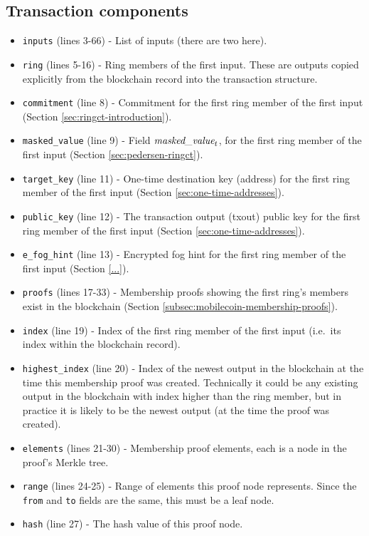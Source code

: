 \begin{appendices}
\section*{Transaction components}
	
\begin{itemize}
	\item {\tt inputs} (lines 3-66) - List of inputs (there are two here).
	\item {\tt ring} (lines 5-16) - Ring members of the first input. These are outputs copied explicitly from the blockchain record into the transaction structure.
	\item {\tt commitment} (line 8) - Commitment for the first ring member of the first input (Section \ref{sec:ringct-introduction}).
	\item {\tt masked\_value} (line 9) - Field $\textrm{\em masked\_value}_t$, for the first ring member of the first input (Section \ref{sec:pedersen-ringct}).
	\item {\tt target\_key} (line 11) - One-time destination key (address) for the first ring member of the first input (Section \ref{sec:one-time-addresses}).
	\item {\tt public\_key} (line 12) - The transaction output (txout) public key for the first ring member of the first input (Section \ref{sec:one-time-addresses}).
	\item {\tt e\_fog\_hint} (line 13) - Encrypted fog hint for the first ring member of the first input (Section \ref{...}).%
	\item {\tt proofs} (lines 17-33) - Membership proofs showing the first ring's members exist in the blockchain (Section \ref{subsec:mobilecoin-membership-proofs}).
	\item {\tt index} (line 19) - Index of the first ring member of the first input (i.e.\ its index within the blockchain record).
	\item {\tt highest\_index} (line 20) - Index of the newest output in the blockchain at the time this membership proof was created. Technically it could be any existing output in the blockchain with index higher than the ring member, but in practice it is likely to be the newest output (at the time the proof was created).
	\item {\tt elements} (lines 21-30) - Membership proof elements, each is a node in the proof's Merkle tree.
	\item {\tt range} (lines 24-25) - Range of elements this proof node represents. Since the {\tt from} and {\tt to} fields are the same, this must be a leaf node.
    \item {\tt hash} (line 27) - The hash value of this proof node.


\end{itemize}
\end{appendices}

